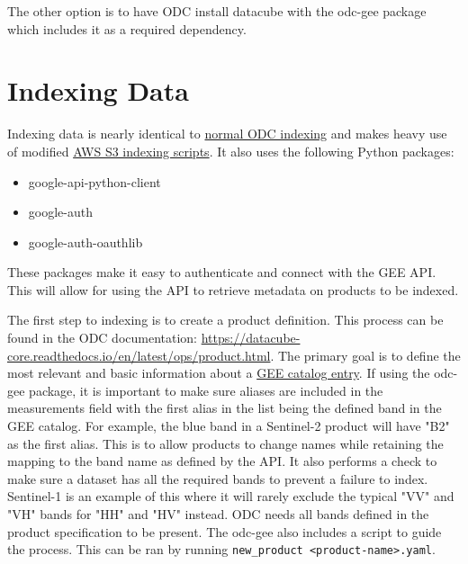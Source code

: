 \documentclass{article}
\begin{document}
The other option is to have ODC install datacube with the odc-gee package which
includes it as a required dependency.

\chapter{Indexing Data}
Indexing data is nearly identical to
\href{https://datacube-core.readthedocs.io/en/latest/ops/indexing.html}{normal
ODC indexing} and makes heavy use of modified
\href{https://github.com/opendatacube/datacube-dataset-config/blob/master/scripts/index_from_s3_bucket.py}{AWS
S3 indexing scripts}. It also uses the following Python packages:
\begin{itemize}
	\item google-api-python-client
	\item google-auth
	\item google-auth-oauthlib
\end{itemize}
These packages make it easy to authenticate and connect with the GEE API. This
will allow for using the API to retrieve metadata on products to be indexed.

The first step to indexing is to create a product definition. This
process can be found in the ODC documentation:
\url{https://datacube-core.readthedocs.io/en/latest/ops/product.html}. The
primary goal is to define the most relevant and basic information about a
\href{https://developers.google.com/earth-engine/datasets}{GEE catalog entry}.
If using the odc-gee package, it is important to make sure aliases are included
in the measurements field with the first alias in the list being the defined
band in the GEE catalog. For example, the blue band in a Sentinel-2 product
will have "B2" as the first alias. This is to allow products to change names
while retaining the mapping to the band name as defined by the API. It also
performs a check to make sure a dataset has all the required bands to prevent a
failure to index. Sentinel-1 is an example of this where it will rarely exclude
the typical "VV" and "VH" bands for "HH" and "HV" instead. ODC needs all bands
defined in the product specification to be present. The odc-gee also includes a
script to guide the process. This can be ran by running
\lstinline{new_product <product-name>.yaml}.
\end{document}
